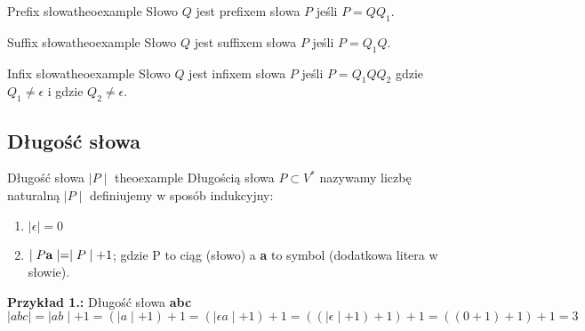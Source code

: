 		 
		\begin{mytheo}{Prefix słowa}{theoexample}
			Słowo $Q$ jest prefixem słowa $P$ jeśli $P = QQ_{1}$.
		\end{mytheo}


 		\begin{mytheo}{Suffix słowa}{theoexample}
			Słowo $Q$ jest suffixem słowa $P$ jeśli $P =Q_{1}Q$.
		\end{mytheo}


 		\begin{mytheo}{Infix słowa}{theoexample}
			Słowo $Q$ jest infixem słowa $P$ jeśli $P =Q_{1}QQ_{2}$  \newline
			gdzie $Q_{1}\neq \epsilon$ i gdzie $Q_{2} \neq \epsilon$.		
		\end{mytheo}

	
	
	\subsection{Długość słowa}
		\begin{mytheo}{Długość słowa $\mid P\mid$ }{theoexample}
			Długością słowa $P \subset V^{*}$ nazywamy liczbę naturalną $\mid P\mid$ 
			definiujemy w sposób indukcyjny:
			 
			\begin{enumerate}[label=(\roman*)]
			  \item $ \mid  \epsilon \mid=0$
			  \item $ \mid P{ \bf a}  \mid= \mid P \mid + 1$; gdzie P to ciąg (słowo) a 
			  {\bf a} to symbol (dodatkowa litera w słowie).
			\end{enumerate} 
		\end{mytheo}
	
		
		\begin{tcolorbox}
			\textbf{Przykład 1.: } Długość słowa {\bf abc} \newline
			$\mid abc \mid = \mid ab \mid + 1 = ( \mid a \mid + 1) + 1 = 
			(\mid \epsilon a \mid + 1) + 1 =   ((\mid \epsilon \mid + 1 )+1)+1 =
			((0+1)+1)+1 = 3$
	
		\end{tcolorbox}
		
